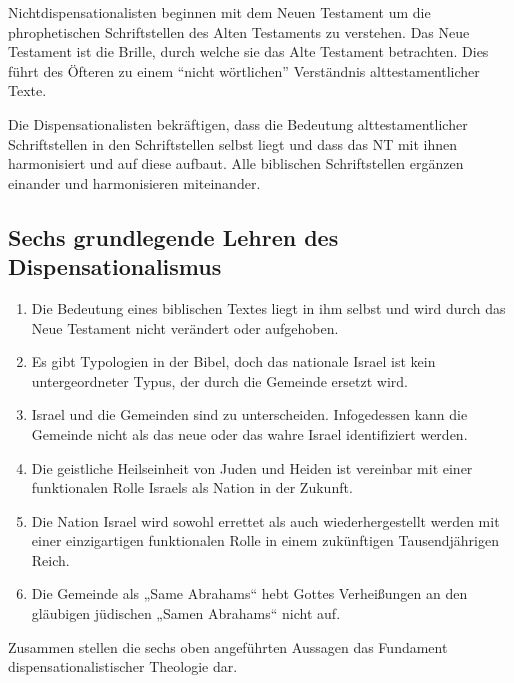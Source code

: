 \documentclass{../../inc/mybib}
\begin{document}
Nichtdispensationalisten beginnen mit dem Neuen Testament um die phrophetischen Schriftstellen des Alten Testaments zu verstehen. Das Neue Testament ist die Brille, durch welche sie das Alte Testament betrachten. Dies führt des Öfteren zu einem \enquote{nicht wörtlichen} Verständnis alttestamentlicher Texte.

Die Dispensationalisten bekräftigen, dass die Bedeutung alttestamentlicher Schriftstellen in den Schriftstellen selbst liegt und dass das NT mit ihnen harmonisiert und auf diese aufbaut. Alle biblischen Schriftstellen ergänzen einander und harmonisieren miteinander.

\subsection{Sechs grundlegende Lehren des Dispensationalismus}
\begin{enumerate}
    \item Die Bedeutung eines biblischen Textes liegt in ihm selbst und wird durch das Neue Testament nicht verändert oder aufgehoben.
    \item Es gibt Typologien in der Bibel, doch das nationale Israel ist kein untergeordneter Typus, der
durch die Gemeinde ersetzt wird.
    \item Israel und die Gemeinden sind zu unterscheiden. Infogedessen kann die Gemeinde nicht als das neue oder das wahre Israel identifiziert werden.
    \item Die geistliche Heilseinheit von Juden und Heiden ist vereinbar mit einer funktionalen Rolle Israels als Nation in der Zukunft.
    \item Die Nation Israel wird sowohl errettet als auch wiederhergestellt werden mit einer einzigartigen funktionalen Rolle in einem zukünftigen Tausendjährigen Reich.
    \item Die Gemeinde als „Same Abrahams“ hebt Gottes Verheißungen an den gläubigen jüdischen „Samen Abrahams“ nicht auf.
\end{enumerate}
Zusammen stellen die sechs oben angeführten Aussagen das Fundament dispensationalistischer Theologie dar.
    
\end{document}

